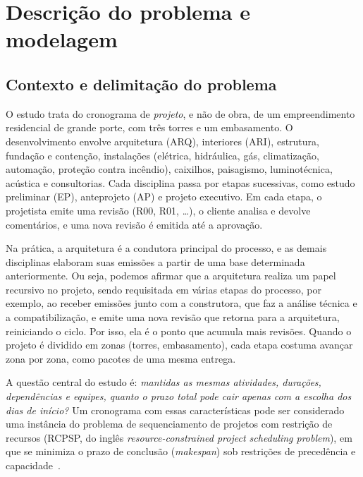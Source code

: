 
\section{Descrição do problema e modelagem}
\label{sec:problema}

\subsection{Contexto e delimitação do problema}
\label{sec:contexto}

O estudo trata do cronograma de \emph{projeto}, e não de obra, de um
empreendimento residencial de grande porte, com três torres e um
embasamento. O desenvolvimento envolve arquitetura (ARQ), interiores (ARI),
estrutura, fundação e contenção, instalações (elétrica, hidráulica, gás,
climatização, automação, proteção contra incêndio), caixilhos, paisagismo,
luminotécnica, acústica e consultorias. Cada disciplina passa por etapas
sucessivas, como estudo preliminar (EP), anteprojeto (AP) e projeto
executivo. Em cada etapa, o projetista emite uma revisão (R00, R01, \ldots),
o cliente analisa e devolve comentários, e uma nova revisão é emitida até a
aprovação.

Na prática, a arquitetura é a condutora principal do processo, e as demais disciplinas
elaboram suas emissões a partir de uma base determinada anteriormente. Ou seja, podemos afirmar que a arquitetura realiza um papel recursivo no projeto, sendo requisitada em várias etapas do processo, por exemplo, ao receber emissões junto com a construtora, que faz a análise técnica e
a compatibilização, e emite uma nova revisão que retorna para a arquitetura, reiniciando o ciclo. Por isso, ela é o ponto que acumula mais revisões.
Quando o projeto é dividido em zonas (torres, embasamento), cada etapa
costuma avançar zona por zona, como pacotes de uma mesma entrega.

A questão central do estudo é: \emph{mantidas as mesmas atividades, durações,
dependências e equipes, quanto o prazo total pode cair apenas com a escolha
dos dias de início?} Um cronograma com essas características pode ser considerado uma
instância do problema de sequenciamento de projetos com restrição de
recursos (RCPSP, do inglês \emph{resource-constrained project scheduling
problem}), em que se minimiza o prazo de conclusão (\emph{makespan}) sob
restrições de precedência e capacidade~\cite{ding2023extensions,kongdou2020}.


